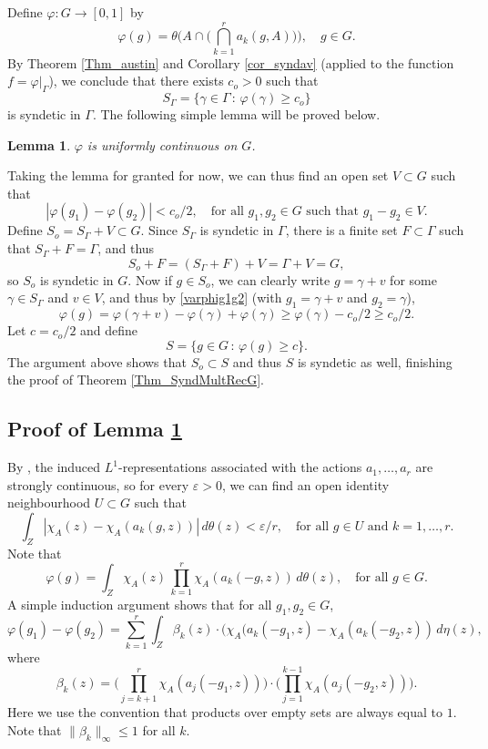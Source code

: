 \documentclass[12pt,reqno,a4paper]{amsart}
\numberwithin{equation}{section}
\newcommand{\ra}{\rightarrow}
\newcommand{\eps}{\varepsilon}
\theoremstyle{theorem}
\newtheorem{lemma}[theorem]{Lemma}
\theoremstyle{task}
\theoremstyle{definition}
\begin{document}
\noindent 
Define $\varphi : G \ra [0,1]$ by
\[
\varphi(g) = \theta\Big(A \cap \Big( \bigcap_{k=1}^r a_k(g,A) \Big)\Big), \quad g \in G.
\] 
By Theorem \ref{Thm_austin} and Corollary \ref{cor_syndav} (applied to the function $f = \varphi|_\Gamma$), we conclude that there exists 
$c_o > 0$ such that
\[
S_\Gamma = \Big\{ \gamma \in \Gamma \, : \, \varphi(\gamma) \geq c_o \Big\}
\]
is syndetic in $\Gamma$. The following simple lemma will be proved below.

\begin{lemma}
\label{lemma_unifcont}
$\varphi$ is uniformly continuous on $G$.
\end{lemma}

Taking the lemma for granted for now, we can thus find an open set $V \subset G$ such that 
\begin{equation}
\label{varphig1g2}
|\varphi(g_1) - \varphi(g_2)| < c_o/2, \quad  
\textrm{for all $g_1,g_2 \in G$ such that $g_1 - g_2 \in V$}. 
\end{equation}
Define $S_o = S_\Gamma + V \subset G$. Since $S_\Gamma$ is syndetic in $\Gamma$, there is a finite set $F \subset \Gamma$ such that $S_\Gamma + F = \Gamma$, 
and thus
\[
S_o + F = (S_\Gamma + F) + V = \Gamma + V = G,
\]
so $S_o$ is syndetic in $G$. Now if $g \in S_o$, we can clearly write $g = \gamma + v$ for some $\gamma \in S_\Gamma$ and $v \in V$, and thus by \eqref{varphig1g2} (with $g_1 = \gamma + v$ and $g_2 = \gamma$),
\[
\varphi(g) = \varphi(\gamma + v) - \varphi(\gamma) + \varphi(\gamma) \geq \varphi(\gamma) - c_o/2 \geq c_o/2.
\]
Let $c = c_o/2$ and define
\[
S = \{ g \in G \, : \, \varphi(g) \geq c \}.
\]
The argument above shows that $S_o \subset S$ and thus $S$ is syndetic as well, finishing the proof of Theorem \ref{Thm_SyndMultRecG}.

\subsection{Proof of Lemma \ref{lemma_unifcont}}

By \cite[Lemme A.1.1]{anetal}, the induced $L^1$-representations associated with the actions $a_1,\ldots,a_r$ are strongly continuous, so for every $\eps > 0$, we can 
find an open identity neighbourhood $U \subset G$ such that
\begin{equation}
\label{akeps}
\int_Z |\chi_A(z) - \chi_{A}(a_k(g,z)) | \, d\theta(z) < \eps/r, \quad \textrm{for all $g \in U$ and $k=1,\ldots,r$}.
\end{equation}
Note that
\[
\varphi(g) 
= \int_Z \chi_A(z) \, \prod_{k=1}^r \chi_A(a_k(-g,z)) \, d\theta(z), \quad \textrm{for all $g \in G$}.
\]
A simple induction argument shows that for all $g_1, g_2 \in G$, 
\[
\varphi(g_1) - \varphi(g_2)
= \sum_{k=1}^r \int_Z \beta_k(z) \cdot (\chi_{A}(a_k(-g_1,z) - \chi_{A}(a_k(-g_2,z)) \, d\eta(z),
\]
where
\[
\beta_k(z) = \big(\prod_{j=k+1}^{r} \chi_{A}(a_j(-g_1,z))\big) \cdot 
\big(\prod_{j=1}^{k-1} \chi_{A}(a_j(-g_2,z))\big).
\]
Here we use the convention that products over empty sets are always equal to $1$. Note that $\|\beta_k\|_\infty \leq 1$ for all $k$. \\
\end{document}
